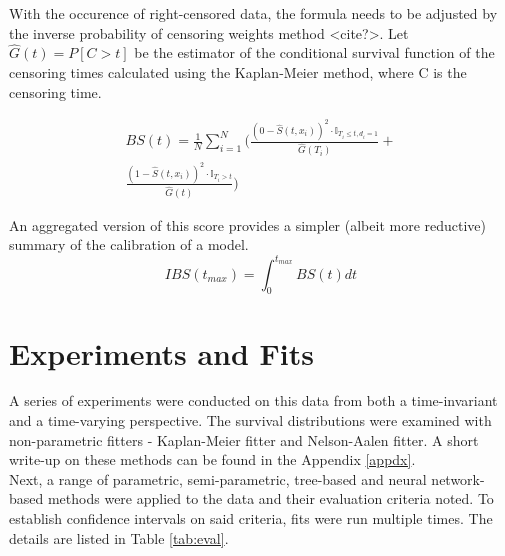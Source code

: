 \documentclass[%
 reprint,
 amsmath,amssymb,
 aps,
]{revtex4-2}
\begin{document}
With the occurence of right-censored data, the formula needs to be adjusted by the inverse probability of censoring weights method <cite?>. Let $\hat{G}(t) = P[C>t]$ be the estimator of the conditional survival function of the censoring times calculated using the Kaplan-Meier method, where C is the censoring time.

\begin{gather*}
BS(t) = \frac{1}{N}\sum^{N}_{i=1}\Bigg(\frac{(0-\hat{S}(t,x_i))^2 \cdot \mathbb{I}_{T_i\le t, d_i = 1}}{\hat{G}(T_i)} +\\
\frac{(1-\hat{S}(t,x_i))^2 \cdot \mathbb{I}_{T_i > t}}{\hat{G}(t)} \Bigg)
\end{gather*}

An aggregated version of this score provides a simpler (albeit more reductive) summary of the calibration of a model.
\[
IBS(t_{max})= \int^{t_{max}}_{0} BS(t) dt
\]

\section{\label{exp}Experiments and Fits}
A series of experiments were conducted on this data from both a time-invariant and a time-varying perspective. The  survival distributions were examined with non-parametric fitters - Kaplan-Meier fitter and Nelson-Aalen fitter. A short write-up on these methods can be found in the Appendix \ref{appdx}. \\

Next, a range of parametric, semi-parametric, tree-based and neural network-based methods were applied to the data and their evaluation criteria noted. To establish confidence intervals on said criteria, fits were run multiple times. The details are listed in Table \ref{tab:eval}.\\
\end{document}

